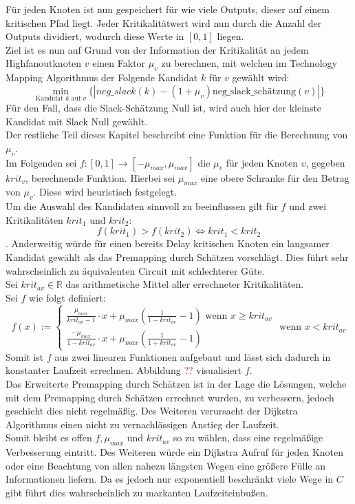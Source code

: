 \documentclass[11pt, a4paper, german]{article}
\newcommand{\TM}{Technology  Mapping }
\begin{document}
Für jeden Knoten ist nun gespeichert für wie viele Outputs, dieser auf einem kritischen Pfad liegt. Jeder Kritikalitätwert wird nun durch die Anzahl der Outputs dividiert, wodurch diese Werte in $[0,1]$ liegen.\\

Ziel ist es nun auf Grund von der Information der Kritikalität an jedem Highfanoutknoten $v$ einen Faktor $\mu_v$ zu berechnen, mit welchen im \TM Algorithmus der Folgende Kandidat $k$ für $v$  gewählt wird: 
\[\min\limits_{\text{Kandidat }k\text{ auf }v}\{|neg\_slack(k)-(1+\mu_v)\text{neg\_slack\_sch\"atzung}(v)|\}\]
Für den Fall, dass die Slack-Schätzung Null ist, wird auch hier der kleinste Kandidat mit Slack Null gewählt.\\

Der restliche Teil dieses Kapitel beschreibt eine Funktion für die Berechnung von $\mu_v$.\\
Im Folgenden sei $f: [0,1] \rightarrow[-\mu_{max}, \mu_{max}]$ die $\mu_v$ für jeden Knoten $v$, gegeben $krit_v$, berechnende Funktion. Hierbei sei  $\mu_{max}$ eine obere Schranke für den Betrag von $\mu_v$. Diese wird heuristisch festgelegt. \\
Um die Auswahl des Kandidaten sinnvoll zu beeinflussen gilt für $f$ und zwei Kritikalitäten $krit_1$ und $krit_2$:
\[f(krit_1) > f(krit_2) \Leftrightarrow krit_1 < krit_2\].
Anderweitig würde für einen bereits Delay kritischen Knoten ein langsamer Kandidat gewählt als das Premapping durch Schätzen vorschlägt. Dies führt sehr wahrscheinlich zu äquivalenten Circuit mit schlechterer Güte.\\
Sei $krit_{av} \in \mathbb{R}$ das arithmetische Mittel aller errechneter Kritikalitäten. \\

Sei $f$ wie folgt definiert:
\[f(x) := \begin{cases} \frac{\mu_{max}}{krit_{av}-1}\cdot x + \mu_{max}(\frac{1}{1-krit_{av}}-1) \text{ wenn } x \geq krit_{av}
 \\ \frac{-\mu_{max}}{1-krit_{av}}\cdot x + \mu_{max}(\frac{1}{1+krit_{av}}-1) \end{cases} \text{ wenn }x < krit_{av}\]
Somit ist $f$ aus zwei linearen Funktionen aufgebaut und lässt sich dadurch in konstanter Laufzeit errechnen. Abbildung \textcolor{red}{??} visualisiert $f$.\\

Das Erweiterte Premapping durch Schätzen ist in der Lage die Lösungen, welche mit dem Premapping durch Schätzen errechnet wurden, zu verbessern, jedoch geschieht dies nicht regelmäßig. Des Weiteren verursacht der Dijkstra Algorithmus einen nicht zu vernachlässigen Anstieg der Laufzeit. \\
Somit bleibt es offen $f, \mu_{max}$ und $krit_{av}$ so zu wählen, dass eine regelmäßige Verbesserung eintritt. Des Weiteren würde ein Dijkstra Aufruf für jeden Knoten oder eine Beachtung von allen nahezu längsten Wegen eine größere Fülle an Informationen liefern. Da es jedoch nur exponentiell beschränkt viele Wege in $C$ gibt führt dies wahrscheinlich zu markanten Laufzeiteinbußen. \\
\end{document}
